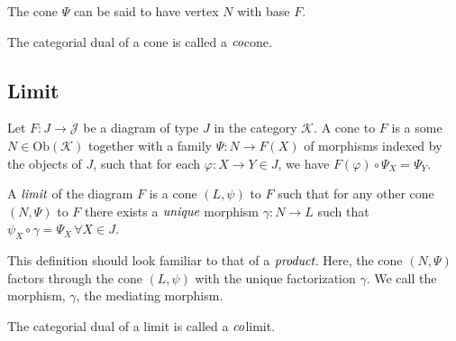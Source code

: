 \begin{rem}
 The cone $\Psi$ can be said to have vertex $N$ with base $F$.
\end{rem}

\begin{rem}[Cocone]
 The categorial dual of a cone is called a $\emph{co}$cone.
\end{rem}

\subsection{Limit} %
\label{subsec:limit}
Let $F: J \to \mathcal{J}$ be a diagram of type $J$ in the category $\mathcal{K}$.
A cone to $F$ is a some $N \in \text{Ob}(\mathcal{K})$ together with a family
$\Psi: N \to F(X)$ of morphisms indexed by the objects of $J$, such that
for each $\varphi: X \to Y \in J$, we have $F(\varphi) \circ \Psi_{X} = \Psi_{Y}$.

A $\emph{limit}$ of the diagram $F$ is a cone $(L,\psi)$ to $F$ such that for any other
cone $(N,\Psi)$ to $F$ there exists a $\emph{unique}$ morphism $\gamma: N \to L$ such that
$\psi_{X} \circ \gamma = \Psi_{X} \, \forall X \in J$.


This definition should look familiar to that of a $\emph{product}$.
Here, the cone $(N, \Psi)$ factors through the cone $(L, \psi)$ with the unique factorization $\gamma$.
We call the morphism, $\gamma$, the mediating morphism.

\begin{rem}[Colimit]
 The categorial dual of a limit is called a $\emph{co}$limit.
\end{rem}


